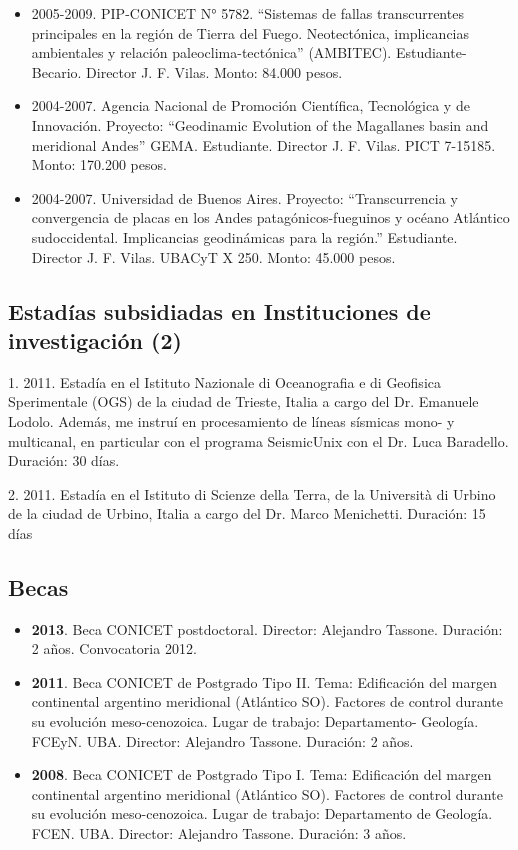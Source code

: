 \documentclass[11pt, a4paper]{article}
\begin{document}
\begin{itemize}
    \item 2005-2009. PIP-CONICET N° 5782. “Sistemas de fallas transcurrentes principales en la región de Tierra del Fuego. Neotectónica, implicancias ambientales y relación paleoclima-tectónica” (AMBITEC). Estudiante-Becario. Director J. F. Vilas. Monto: 84.000 pesos.
    \item 2004-2007. Agencia Nacional de Promoción Científica, Tecnológica y de Innovación. Proyecto: “Geodinamic Evolution of the Magallanes basin and meridional Andes” GEMA. Estudiante. Director J. F. Vilas. PICT 7-15185. Monto: 170.200 pesos.
    \item 2004-2007. Universidad de Buenos Aires. Proyecto: “Transcurrencia y convergencia de placas en los Andes patagónicos-fueguinos y océano Atlántico sudoccidental. Implicancias geodinámicas para la región.” Estudiante. Director J. F. Vilas. UBACyT X 250. Monto: 45.000 pesos.
\end{itemize}


\subsection{Estadías subsidiadas en Instituciones de investigación (2)}

1. 2011. Estadía en el Istituto Nazionale di Oceanografia e di Geofisica Sperimentale (OGS) de la ciudad de Trieste, Italia a cargo del Dr. Emanuele Lodolo. Además, me instruí en procesamiento de líneas sísmicas mono- y multicanal, en particular con el programa SeismicUnix con el Dr. Luca Baradello. Duración: 30 días.

2. 2011. Estadía en el Istituto di Scienze della Terra, de la Università di Urbino de la ciudad de Urbino, Italia a cargo del Dr. Marco Menichetti. Duración: 15 días


\subsection{Becas}

\begin{itemize}
    \item \textbf{2013}. Beca CONICET postdoctoral. Director: Alejandro Tassone. Duración: 2 años. Convocatoria 2012.
    \item \textbf{2011}. Beca CONICET de Postgrado Tipo II. Tema: Edificación del margen continental argentino meridional (Atlántico SO). Factores de control durante su evolución meso-cenozoica. Lugar de trabajo: Departamento- Geología. FCEyN. UBA. Director: Alejandro Tassone. Duración: 2 años.
    \item \textbf{2008}. Beca CONICET de Postgrado Tipo I. Tema: Edificación del margen continental argentino meridional (Atlántico SO). Factores de control durante su evolución meso-cenozoica. Lugar de trabajo: Departamento de Geología. FCEN. UBA. Director: Alejandro Tassone. Duración: 3 años.
\end{itemize}
\end{document}
